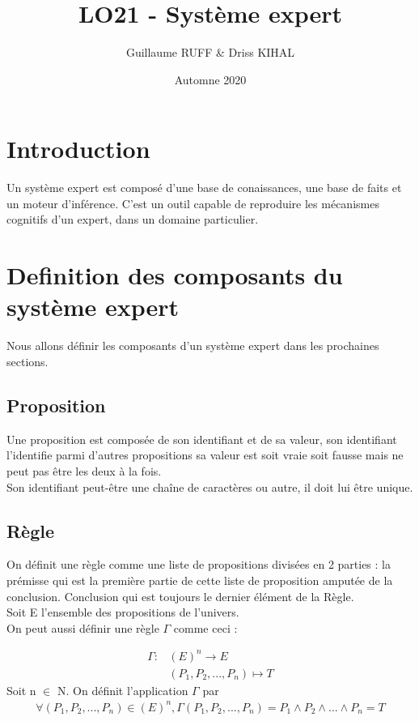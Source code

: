 \documentclass{article}
\title{LO21 - Système expert}
\author{Guillaume RUFF & Driss KIHAL}
\date{Automne 2020}
\begin{document}
\maketitle


\section{Introduction}
Un système expert est composé d'une base de conaissances, une base de faits et un moteur d'inférence.
C'est un outil capable de reproduire les mécanismes cognitifs d'un expert, dans un domaine particulier.

\section{Definition des composants du système expert}
Nous allons définir les composants d'un système expert dans les prochaines sections.
\subsection{Proposition}
Une proposition est composée de son identifiant et de sa valeur, son identifiant l'identifie parmi d'autres propositions sa valeur est soit vraie soit fausse mais ne peut pas être les deux à la fois. \\
Son identifiant peut-être une chaîne de caractères ou autre, il doit lui être unique.
\subsection{Règle}
On définit une règle comme une liste de propositions divisées en 2 parties : la prémisse qui est la première partie de cette liste de proposition amputée de la conclusion. Conclusion qui est toujours le dernier élément de la Règle. 
\\Soit E l'ensemble des propositions de l'univers.\\

On peut aussi définir une règle $\Gamma$ comme ceci : 

\begin{align*}
    \Gamma : &(E)^n \longrightarrow E\\ 
    &(P_1,P_2,...,P_n) \longmapsto T
\end{align*}
Soit n $\in$ N. On définit l'application $\Gamma$ par 
\begin{align*}
    \forall (P_1,P_2,...,P_n) \in (E)^n,\Gamma(P_1,P_2,...,P_n) = P_1\land P_2 \land ... \land P_n = T
\end{align*}
\end{document}
